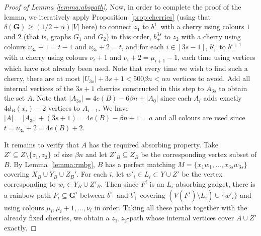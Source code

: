 \documentclass[10pt,a4paper]{amsart}
\newcommand{\bB}{\beta}
\newcommand{\mbf}[1]{\mathbf{#1}}
\newcommand{\sm}{\setminus}
\begin{document}
\begin{proof}[Proof of Lemma \ref{lemma:abspath}]
Now, in order to complete the proof of the lemma, we iteratively apply Proposition~\ref{prop:cherries} (using that $\delta(\mbf G)\geq (1/2+\alpha)|V|$ here) to connect $z_1$ to $b_-^1$ with a cherry using colours $1$ and $2$ (that is, graphs $G_1$ and $G_2$) in this order, $b_{+}^{3s}$ to $z_2$ with a cherry using colours $\nu_{3s}+1=t-1$ and $\nu_{3s}+2=t$, and for each $i \in [3s -1]$, $b_{+}^i$ to $b_-^{i+1}$ with a cherry using colours $\nu_i+1$ and $\nu_i+2=\mu_{i+1}-1$, each time using vertices which have not already been used. Note that every time we wish to find such a cherry, there are at most $|U_{3s}|+3s+1< 500\beta n <\alpha n$ vertices to avoid. Add all internal vertices of the $3s+1$ cherries constructed in this step to $A_{3s}$ to obtain the set $A$. Note that $|A_{3s}|=4e(B)-6\beta n+|A_0|$ since each $A_i$ adds exactly $4 d_B(x_i)-2$ vertices to $A_{i-1}$.
We have $
|A| = |A_{3s}|+ (3s+1) = 4e(B)-\bB n+1=a$
and all colours are used since $t=\nu_{3s}+2=4e(B)+2$.

It remains to verify that $A$ has the required absorbing property. Take $Z'\subseteq Z\sm \{z_1,z_2\}$ of size $\beta n$ and let $Z'_B\subseteq Z_B$ be the corresponding vertex subset of $B$. By Lemma~\ref{lemma:rmbg}, $B$ has a perfect matching $M=\{x_1w_1,\ldots,x_{3s}w_{3s}\}$ covering $X_B\cup Y_B\cup Z_B'$. For each $i$, let $w'_i\in L_i\subset Y\cup Z'$ be the vertex corresponding to $w_i\in Y_B\cup Z'_B$. Then since $F^i$ is an $L_i$-absorbing gadget, there is a rainbow path $P_i\subseteq \mbf G^i$ between $b_-^i$ and $b_{+}^i$ covering $(V(F^i)\sm L_i)\cup \{w'_i\}$ and using colours $\mu_i,\mu_i+1,\ldots,\nu_i$ in order. Taking all these paths together with the already fixed cherries, we obtain a $z_1,z_2$-path whose internal vertices cover $A\cup Z'$ exactly.  \end{proof}
\end{document}
